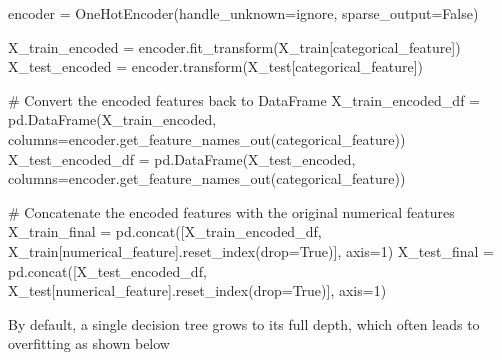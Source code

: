 \documentclass[
  letterpaper,
  DIV=11,
  numbers=noendperiod]{scrreprt}
\newenvironment{Shaded}{\begin{snugshade}}{\end{snugshade}}
\newcommand{\CommentTok}[1]{\textcolor[rgb]{0.37,0.37,0.37}{#1}}
\newcommand{\DecValTok}[1]{\textcolor[rgb]{0.68,0.00,0.00}{#1}}
\newcommand{\NormalTok}[1]{\textcolor[rgb]{0.00,0.23,0.31}{#1}}
\newcommand{\OperatorTok}[1]{\textcolor[rgb]{0.37,0.37,0.37}{#1}}
\newcommand{\StringTok}[1]{\textcolor[rgb]{0.13,0.47,0.30}{#1}}
\newcommand{\VariableTok}[1]{\textcolor[rgb]{0.07,0.07,0.07}{#1}}
\begin{document}
\begin{Shaded}
\begin{Highlighting}[]
\NormalTok{encoder }\OperatorTok{=}\NormalTok{ OneHotEncoder(handle\_unknown}\OperatorTok{=}\StringTok{\textquotesingle{}ignore\textquotesingle{}}\NormalTok{, sparse\_output}\OperatorTok{=}\VariableTok{False}\NormalTok{)}

\NormalTok{X\_train\_encoded }\OperatorTok{=}\NormalTok{ encoder.fit\_transform(X\_train[categorical\_feature])}
\NormalTok{X\_test\_encoded }\OperatorTok{=}\NormalTok{ encoder.transform(X\_test[categorical\_feature])}

\CommentTok{\# Convert the encoded features back to DataFrame}
\NormalTok{X\_train\_encoded\_df }\OperatorTok{=}\NormalTok{ pd.DataFrame(X\_train\_encoded, columns}\OperatorTok{=}\NormalTok{encoder.get\_feature\_names\_out(categorical\_feature))}
\NormalTok{X\_test\_encoded\_df }\OperatorTok{=}\NormalTok{ pd.DataFrame(X\_test\_encoded, columns}\OperatorTok{=}\NormalTok{encoder.get\_feature\_names\_out(categorical\_feature))}

\CommentTok{\# Concatenate the encoded features with the original numerical features}
\NormalTok{X\_train\_final }\OperatorTok{=}\NormalTok{ pd.concat([X\_train\_encoded\_df, X\_train[numerical\_feature].reset\_index(drop}\OperatorTok{=}\VariableTok{True}\NormalTok{)], axis}\OperatorTok{=}\DecValTok{1}\NormalTok{)}
\NormalTok{X\_test\_final }\OperatorTok{=}\NormalTok{ pd.concat([X\_test\_encoded\_df, X\_test[numerical\_feature].reset\_index(drop}\OperatorTok{=}\VariableTok{True}\NormalTok{)], axis}\OperatorTok{=}\DecValTok{1}\NormalTok{)}
\end{Highlighting}
\end{Shaded}

By default, a single decision tree grows to its full depth, which often
leads to overfitting as shown below
\end{document}
